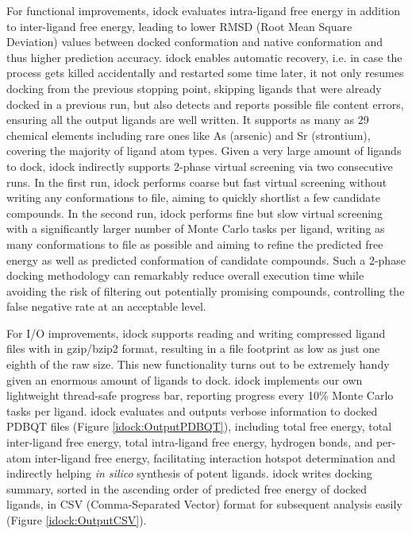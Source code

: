 For functional improvements, idock evaluates intra-ligand free energy in addition to inter-ligand free energy, leading to lower RMSD (Root Mean Square Deviation) values between docked conformation and native conformation and thus higher prediction accuracy. idock enables automatic recovery, i.e. in case the process gets killed accidentally and restarted some time later, it not only resumes docking from the previous stopping point, skipping ligands that were already docked in a previous run, but also detects and reports possible file content errors, ensuring all the output ligands are well written. It supports as many as 29 chemical elements including rare ones like As (arsenic) and Sr (strontium), covering the majority of ligand atom types. Given a very large amount of ligands to dock, idock indirectly supports 2-phase virtual screening via two consecutive runs. In the first run, idock performs coarse but fast virtual screening without writing any conformations to file, aiming to quickly shortlist a few candidate compounds. In the second run, idock performs fine but slow virtual screening with a significantly larger number of Monte Carlo tasks per ligand, writing as many conformations to file as possible and aiming to refine the predicted free energy as well as predicted conformation of candidate compounds. Such a 2-phase docking methodology can remarkably reduce overall execution time while avoiding the risk of filtering out potentially promising compounds, controlling the false negative rate at an acceptable level.

For I/O improvements, idock supports reading and writing compressed ligand files with in gzip/bzip2 format, resulting in a file footprint as low as just one eighth of the raw size. This new functionality turns out to be extremely handy given an enormous amount of ligands to dock. idock implements our own lightweight thread-safe progress bar, reporting progress every 10\% Monte Carlo tasks per ligand. idock evaluates and outputs verbose information to docked PDBQT files (Figure \ref{idock:OutputPDBQT}), including total free energy, total inter-ligand free energy, total intra-ligand free energy, hydrogen bonds, and per-atom inter-ligand free energy, facilitating interaction hotspot determination and indirectly helping \textit{in silico} synthesis of potent ligands. idock writes docking summary, sorted in the ascending order of predicted free energy of docked ligands, in CSV (Comma-Separated Vector) format for subsequent analysis easily (Figure \ref{idock:OutputCSV}).

